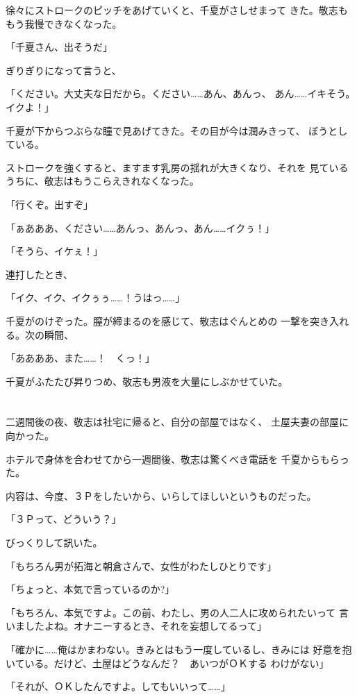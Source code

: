 ﻿\documentclass[
    book,tate,
    line_length=30zw,
    jafontsize=12pt,
    paper=b5j,
    landscape,
    ]{jlreq}
\begin{document}
徐々にストロークのピッチをあげていくと、千夏がさしせまって
きた。敬志ももう我慢できなくなった。

「千夏さん、出そうだ」

ぎりぎりになって言うと、

「ください。大丈夫な日だから。ください……あん、あんっ、
あん……イキそう。イクよ！」

千夏が下からつぶらな瞳で見あげてきた。その目が今は潤みきって、
ぼうとしている。

ストロークを強くすると、ますます乳房の揺れが大きくなり、それを
見ているうちに、敬志はもうこらえきれなくなった。

「行くぞ。出すぞ」

「ぁあああ、ください……あんっ、あんっ、あん……イクぅ！」

「そうら、イケぇ！」

連打したとき、

「イク、イク、イクぅぅ……！うはっ……」

千夏がのけぞった。膣が締まるのを感じて、敬志はぐんとめの
一撃を突き入れる。次の瞬間、

「ああああ、また……！　くっ！」

千夏がふたたび昇りつめ、敬志も男液を大量にしぶかせていた。

\section*{}

二週間後の夜、敬志は社宅に帰ると、自分の部屋ではなく、
土屋夫妻の部屋に向かった。

ホテルで身体を合わせてから一週間後、敬志は驚くべき電話を
千夏からもらった。

内容は、今度、３Ｐをしたいから、いらしてほしいというものだった。

「３Ｐって、どういう？」

びっくりして訊いた。

「もちろん男が拓海と朝倉さんで、女性がわたしひとりです」

「ちょっと、本気で言っているのか?」

「もちろん、本気ですよ。この前、わたし、男の人二人に攻められたいって
言いましたよね。オナニーするとき、それを妄想してるって」

「確かに……俺はかまわない。きみとはもう一度しているし、きみには
好意を抱いている。だけど、土屋はどうなんだ？　あいつがＯＫする
わけがない」

「それが、ＯＫしたんですよ。してもいいって……」
\end{document}
